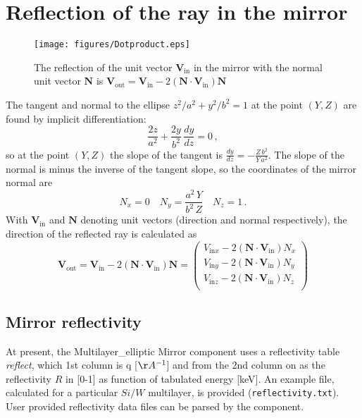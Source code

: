 \section{Reflection of the ray in the mirror}
\begin{figure}[htb!]
\centering
\texttt{[image: figures/Dotproduct.eps]}
 \caption{The reflection of the unit vector $\mathbf{V}_\textrm{in}$ in the mirror with the normal unit
 vector $\boldsymbol{{N}}$ is $\boldsymbol{{V}}_\textrm{out} = \boldsymbol{{V}}_\textrm{in} -2(\boldsymbol{{N}}\cdot\boldsymbol{{V}}_\textrm{in})\boldsymbol{{N}}$}\label{fig:dotProduct}
\end{figure}

The tangent and normal to the ellipse $z^2/a^2 + y^2/b^2=1$ at the
point $(Y,Z)$ are found by implicit differentiation: \begin{equation} 
\frac{2z}{a^2} + \frac{2y}{b^2} \,\frac{dy}{dz} = 0\,, \end{equation} so at the
point $(Y,Z)$ the slope of the tangent is $\frac{dy}{dz} =
-\frac{Z\,b^2}{Y\,a^2}$. The slope of the normal is minus the
inverse of the tangent slope, so the coordinates of the mirror
normal are \begin{equation} N_x = 0 \quad N_y = \frac{a^2\,Y}{b^2\,Z} \quad N_z =
1\,. \end{equation} With $\mathbf{V}_\textrm{in}$ and $\mathbf{N}$ denoting unit
vectors (direction and normal respectively), the direction of the
reflected ray is calculated as \begin{equation} \boldsymbol{{V}}_\textrm{out} =
\boldsymbol{{V}}_\textrm{in} -2(\boldsymbol{{N}}\cdot\boldsymbol{{V}}_\textrm{in})\boldsymbol{{N}} =
        \left(
      \begin{array}{c}
        V_{\textrm{in}x} - 2(\boldsymbol{{N}}\cdot\boldsymbol{{V}}_\textrm{in})N_x \\
               V_{\textrm{in}y} - 2(\boldsymbol{{N}}\cdot\boldsymbol{{V}}_\textrm{in})N_y \\
                V_{\textrm{in}z} - 2(\boldsymbol{{N}}\cdot\boldsymbol{{V}}_\textrm{in})N_z \\
      \end{array}
    \right)
\end{equation}


\subsection{Mirror reflectivity}
\label{ss:mirrorreflecttable}

At present, the Multilayer\_elliptic Mirror component uses a reflectivity table \textit{reflect}, 
which 1st column is q [$\AA^{-1}$] and from the 2nd column on as the reflectivity $R$ in [0-1]
as function of tabulated energy [\si{keV}]. 
An example file, calculated for a particular $Si/W$ multilayer, is provided (\verb+reflectivity.txt+).
User provided reflectivity data files can be parsed by the component.

